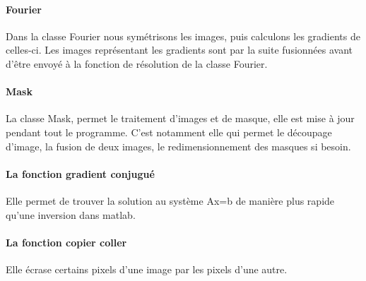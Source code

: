 \paragraph{Fourier}
Dans la classe Fourier nous symétrisons les images, puis calculons les gradients de celles-ci. Les images représentant les gradients sont par la suite fusionnées avant d'être envoyé à la fonction de résolution de la classe Fourier. 
\paragraph{Mask}
La classe Mask, permet le traitement d'images et de masque, elle est mise à jour pendant tout le programme. C'est notamment elle qui permet le découpage d'image, la fusion de deux images, le redimensionnement des masques si besoin. 
\paragraph{La fonction gradient conjugué}
Elle permet de trouver la solution au système Ax=b de manière plus rapide qu'une inversion dans matlab.
\paragraph{La fonction copier coller} 
Elle écrase certains pixels d'une image par les pixels d'une autre.
